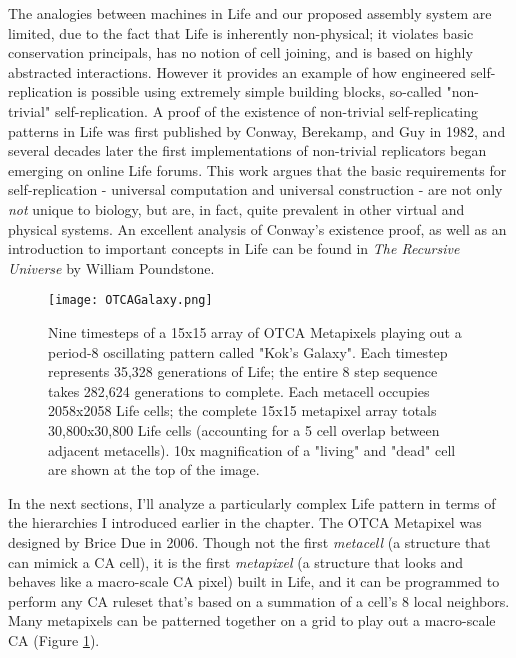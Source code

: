 {The analogies between machines in Life and our proposed assembly system are limited, due to the fact that Life is inherently non-physical; it violates basic conservation principals, has no notion of cell joining, and is based on highly abstracted interactions.  However it provides an example of how engineered self-replication is possible using extremely simple building blocks, so-called "non-trivial" self-replication.  A proof of the existence of non-trivial self-replicating patterns in Life was first published by Conway, Berekamp, and Guy in 1982\cite{Berekamp1982}, and several decades later the first implementations of non-trivial replicators began emerging on online Life forums.  This work argues that the basic requirements for self-replication - universal computation and universal construction - are not only \textit{not} unique to biology, but are, in fact, quite prevalent in other virtual and physical systems.  An excellent analysis of Conway's existence proof, as well as an introduction to important concepts in Life can be found in \textit{The Recursive Universe} by William Poundstone\cite{Poundstone1985}.\\

\begin{figure}
  \texttt{[image: OTCAGalaxy.png]}
  \caption{Nine timesteps of a 15x15 array of OTCA Metapixels playing out a period-8 oscillating pattern called "Kok's Galaxy".  Each timestep represents 35,328 generations of Life; the entire 8 step sequence takes 282,624 generations to complete.  Each metacell occupies 2058x2058 Life cells; the complete 15x15 metapixel array totals 30,800x30,800 Life cells (accounting for a 5 cell overlap between adjacent metacells).  10x magnification of a "living" and "dead" cell are shown at the top of the image.}
  \label{fig:OTCAGalaxy}
\end{figure}

In the next sections, I'll analyze a particularly complex Life pattern in terms of the hierarchies I introduced earlier in the chapter.  The OTCA Metapixel was designed by Brice Due in 2006\cite{Due2006}\cite{Ghassaei2015}.  Though not the first \textit{metacell} (a structure that can mimick a CA cell), it is the first \textit{metapixel} (a structure that looks and behaves like a macro-scale CA pixel) built in Life, and it can be programmed to perform any CA ruleset that's based on a summation of a cell's 8 local neighbors.  Many metapixels can be patterned together on a grid to play out a macro-scale CA (Figure \ref{fig:OTCAGalaxy}).

}
